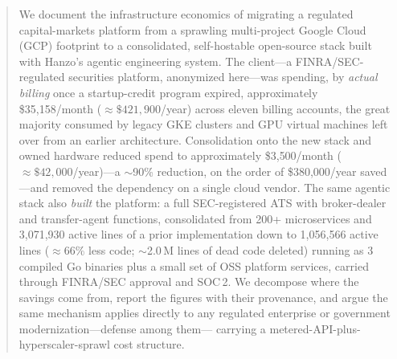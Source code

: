 \documentclass[11pt,letterpaper]{article}
\begin{document}
\makecover

\begin{abstract}
We document the infrastructure economics of migrating a regulated capital-markets
platform from a sprawling multi-project Google Cloud (GCP) footprint to a
consolidated, self-hostable open-source stack built with Hanzo's agentic
engineering system. The client---a FINRA/SEC-regulated securities platform,
anonymized here---was spending, by \emph{actual billing} once a startup-credit
program expired, approximately \$35{,}158/month ($\approx\$421{,}900$/year) across
eleven billing accounts, the great majority consumed by legacy GKE clusters and GPU
virtual machines left over from an earlier architecture. Consolidation onto the new
stack and owned hardware reduced spend to approximately \$3{,}500/month
($\approx\$42{,}000$/year)---a $\sim$90\% reduction, on the order of \$380{,}000/year
saved---and removed the dependency on a single cloud vendor. The same agentic stack
also \emph{built} the platform: a full SEC-registered ATS with broker-dealer and
transfer-agent functions, consolidated from 200+ microservices and
3{,}071{,}930 active lines of a prior implementation down to 1{,}056{,}566 active
lines ($\approx$66\% less code; $\sim$2.0\,M lines of dead code deleted) running as
3 compiled Go binaries plus a small set of OSS platform services, carried through
FINRA/SEC approval and SOC\,2. We decompose where the savings come from, report the
figures with their provenance, and argue the same mechanism applies directly to
any regulated enterprise or government modernization---defense among them---
carrying a metered-API-plus-hyperscaler-sprawl cost structure.
\end{abstract}
\end{document}
